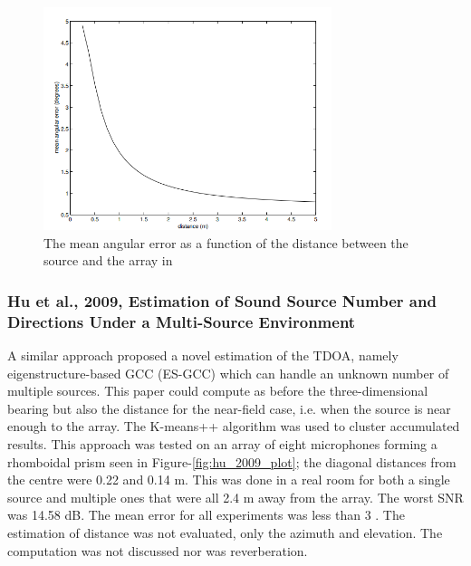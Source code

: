 \documentclass{report}
\begin{document}
\begin{figure}[H]
\includegraphics[width=0.75\textwidth]{./valin_2003/plot.png}
\centering
\caption{The mean angular error as a function of the distance between the source and the array in \cite{valin_robust_2003}}
\label{fig:valin_2003_plot}
\centering
\end{figure}

\subsubsection{Hu et al., 2009, Estimation of Sound Source Number and Directions Under a Multi-Source Environment}

A similar approach \cite{hu_estimation_2009} proposed a novel estimation of the TDOA, namely eigenstructure-based GCC (ES-GCC) which can handle an unknown number of multiple sources. This paper could compute as before the three-dimensional bearing but also the distance for the near-field case, i.e. when the source is near enough to the array. The K-means++ algorithm was used to cluster accumulated results. This approach was tested on an array of eight microphones forming a rhomboidal prism seen in Figure-\ref{fig:hu_2009_plot}; the diagonal distances from the centre were 0.22 and 0.14 \si{m}. This was done in a real room for both a single source and multiple ones that were all 2.4 \si{m} away from the array. The worst SNR was 14.58 \si{dB}. The mean error for all experiments was less than 3 \si{\deg}. The estimation of distance was not evaluated, only the azimuth and elevation. The computation was not discussed nor was reverberation.
\end{document}
